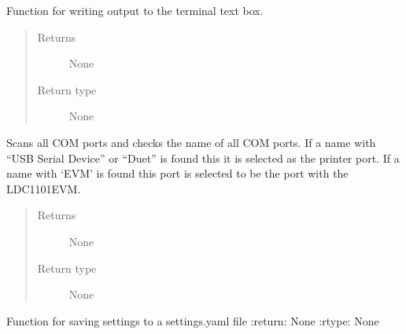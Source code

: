 \documentclass[letterpaper,10pt,english]{sphinxmanual}
\begin{document}
\begin{fulllineitems}
\begin{fulllineitems}
\end{fulllineitems}


\begin{fulllineitems}
\label{\detokenize{index:app.MainWindow.output_to_terminal}}
\sphinxAtStartPar
Function for writing output to the terminal text box.
\begin{quote}\begin{description}
\item[{Returns}] \leavevmode
\sphinxAtStartPar
None

\item[{Return type}] \leavevmode
\sphinxAtStartPar
None

\end{description}\end{quote}

\end{fulllineitems}


\begin{fulllineitems}
\label{\detokenize{index:app.MainWindow.reload}}
\sphinxAtStartPar
Scans all COM ports and checks the name of all COM ports. If a name with “USB Serial Device” or “Duet” is found this it is selected as the printer port. If a name with ‘EVM’ is found this port is selected to be the port with the LDC1101EVM.
\begin{quote}\begin{description}
\item[{Returns}] \leavevmode
\sphinxAtStartPar
None

\item[{Return type}] \leavevmode
\sphinxAtStartPar
None

\end{description}\end{quote}

\end{fulllineitems}


\begin{fulllineitems}
\label{\detokenize{index:app.MainWindow.save_settings}}
\sphinxAtStartPar
Function for saving settings to a settings.yaml file
:return: None
:rtype: None


\end{fulllineitems}
\end{fulllineitems}
\end{document}

